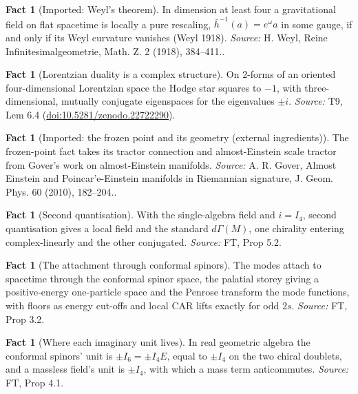 \documentclass[11pt]{article}
\theoremstyle{definition}
\newtheorem{fact}[theorem]{Fact}
\theoremstyle{plain}
\providecommand{\hb}{}\renewcommand{\hb}{\bar{h}}
\begin{document}
\begin{fact}[Imported: Weyl's theorem]\label{c:correspondence.imported-weyls-theorem}
In dimension at least four a gravitational field on flat spacetime is locally a pure rescaling, $\hb^{-1}(a) = e^{\omega}a$ in some gauge, if and only if its Weyl curvature vanishes (Weyl 1918).
\emph{Source:} H. Weyl, Reine Infinitesimalgeometrie, Math. Z. 2 (1918), 384--411..
\end{fact}

\begin{fact}[Lorentzian duality is a complex structure]\label{c:correspondence.lorentzian-duality-complex-structure}
On $2$-forms of an oriented four-dimensional Lorentzian space the Hodge star squares to $-1$, with three-dimensional, mutually conjugate eigenspaces for the eigenvalues $\pm i$.
\emph{Source:} T9, Lem 6.4 (\href{https://doi.org/10.5281/zenodo.22722290}{doi:10.5281/zenodo.22722290}).
\end{fact}

\begin{fact}[Imported: the frozen point and its geometry (external ingredients)]\label{c:dark-energy.imported-frozen-point-geometry-external}
The frozen-point fact takes its tractor connection and almost-Einstein scale tractor from Gover's work on almost-Einstein manifolds.
\emph{Source:} A. R. Gover, Almost Einstein and Poincar'e-Einstein manifolds in Riemannian signature, J. Geom. Phys. 60 (2010), 182--204..
\end{fact}

\begin{fact}[Second quantisation]\label{c:field-theory.second-quantisation}
With the single-algebra field and $i = I_4$, second quantisation gives a local field and the standard $d\Gamma(M)$, one chirality entering complex-linearly and the other conjugated.
\emph{Source:} FT, Prop 5.2.
\end{fact}

\begin{fact}[The attachment through conformal spinors]\label{c:field-theory.twistor-attachment}
The modes attach to spacetime through the conformal spinor space, the palatial storey giving a positive-energy one-particle space and the Penrose transform the mode functions, with floors as energy cut-offs and local CAR lifts exactly for odd $2s$.
\emph{Source:} FT, Prop 3.2.
\end{fact}

\begin{fact}[Where each imaginary unit lives]\label{c:field-theory.where-each-lives}
In real geometric algebra the conformal spinors' unit is $\pm I_6 = \pm I_4E$, equal to $\pm I_4$ on the two chiral doublets, and a massless field's unit is $\pm I_4$, with which a mass term anticommutes.
\emph{Source:} FT, Prop 4.1.
\end{fact}
\end{document}

